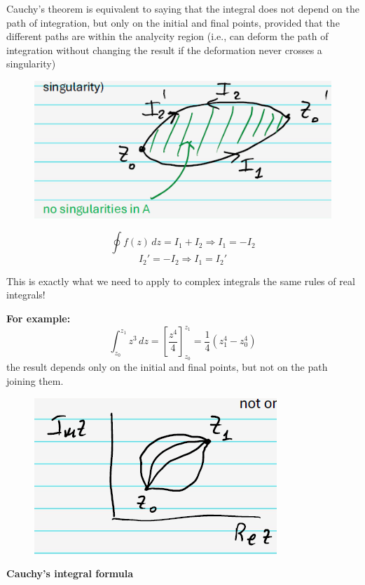 \documentclass{article}
\begin{document}
\noindent
Cauchy’s theorem is equivalent to saying that the integral does not depend on the path of integration, but only on the initial and final points, provided that the different paths are within the analycity region (i.e., can deform the path of integration without changing the result if the deformation never crosses a singularity)
\begin{figure}[h]
    \centering
    \includegraphics[width=0.5\linewidth]{fig15.png}
\end{figure}
\[
\oint f(z)\,dz = I_1 + I_2 \Rightarrow I_1 = -I_2
\]
\[
I_2' = -I_2 \Rightarrow I_1 = I_2'
\]

\newpage

\noindent
This is exactly what we need to apply to complex integrals the same rules of real integrals!

\noindent
\textbf{For example:}
\begin{equation}
    \int_{z_0}^{z_1} z^3 \, dz 
= \left[ \frac{z^4}{4} \right]_{z_0}^{z_1}
= \frac{1}{4} \left( z_1^4 - z_0^4 \right)
\end{equation}
the result depends only on the initial and final points, but not on the path joining them.
\begin{figure}[h]
    \centering
    \includegraphics[width=0.3\linewidth]{fig16.png}
\end{figure}

\vspace{2mm}\noindent
\textbf{Cauchy’s integral formula}
\end{document}
